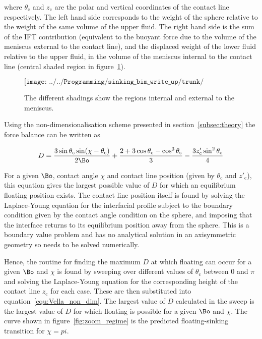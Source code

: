 {where $\theta_{\text{c}}$ and $z_{\text{c}}$ are the polar and vertical coordinates of the contact line respectively. The left hand side corresponds to the weight of the sphere relative to the weight of the same volume of the upper fluid. The right hand side is the sum of the IFT contribution (equivalent to the buoyant force due to the volume of the meniscus external to the contact line), and the displaced weight of the lower fluid relative to the upper fluid, in the volume of the meniscus internal to the contact line (central shaded region in figure~\ref{fig:Keller_fig}).

\begin{figure}
  $$\texttt{[image: ../../Programming/sinking\_bim\_write\_up/trunk/Keller\_fig.eps]}$$
  \caption{The different shadings show the regions internal and external to the meniscus.  \label{fig:Keller_fig}}
\end{figure}

Using the non-dimensionalisation scheme presented in section~\ref{subsec:theory} the force balance can be written as

\begin{equation}
\label{equ:Vella_non_dim}
D = \frac{3 \sin \theta_{\text{c}} \sin(\chi - \theta_{\text{c}})}{2 \Bo} + \frac{2 + 3 \cos \theta_{\text{c}} - \cos^{3} \theta_{\text{c}}}{3} - \frac{3 z'_{\text{c}} \sin^{2}\theta_{\text{c}}}{4}
\end{equation}

For a given $\Bo$, contact angle $\chi$ and contact line position (given by $\theta_{\text{c}}$ and $z'_{\text{c}}$), this equation gives the largest possible value of $D$ for which an equilibrium floating position exists. The contact line position itself is found by solving the Laplace-Young equation for the interfacial profile subject to the boundary condition given by the contact angle condition on the sphere, and imposing that the interface returns to its equilibrium position away from the sphere. This is a boundary value problem \citep{Riley06} and has no analytical solution in an axisymmetric geometry so needs to be solved numerically. 

Hence, the routine for finding the maximum $D$ at which floating can occur for a given $\Bo$ and $\chi$ is found by sweeping over different values of $\theta_{\text{c}}$ between $0$ and $\pi$ and solving the Laplace-Young equation for the corresponding height of the contact line $z_{\text{c}}$ for each case. These are then substituted into equation~\ref{equ:Vella_non_dim}. The largest value of $D$ calculated in the sweep is the largest value of $D$ for which floating is possible for a given $\Bo$ and $\chi$. The curve shown in figure~\ref{fig:zoom_regime} is the predicted floating-sinking transition for $\chi = pi$.

}

